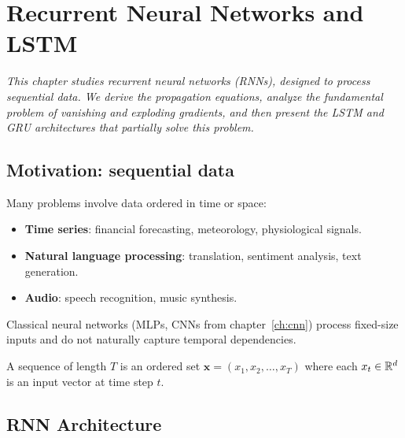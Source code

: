 \chapter{Recurrent Neural Networks and LSTM}
\label{ch:rnn_lstm}

\noindent\textit{This chapter studies recurrent neural networks (RNNs), designed to process
sequential data. We derive the propagation equations, analyze the fundamental
problem of vanishing and exploding gradients, and then present the LSTM and GRU
architectures that partially solve this problem.}\medskip

\section{Motivation: sequential data}
\label{sec:rnn-motivation}

Many problems involve data ordered in time or space:
\begin{itemize}
  \item \textbf{Time series}: financial forecasting, meteorology,
    physiological signals.
  \item \textbf{Natural language processing}: translation, sentiment analysis,
    text generation.
  \item \textbf{Audio}: speech recognition, music synthesis.
\end{itemize}

Classical neural networks (MLPs, CNNs from chapter~\ref{ch:cnn}) process
fixed-size inputs and do not naturally capture temporal dependencies.

\begin{definition}[Sequence]
A sequence of length $T$ is an ordered set
$\mathbf{x} = (x_1, x_2, \ldots, x_T)$ where each $x_t \in \mathbb{R}^d$ is an
input vector at time step $t$.
\end{definition}

\section{RNN Architecture}
\label{sec:rnn-arch}

